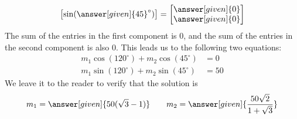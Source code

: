 \documentclass{ximera}
\begin{document}
\begin{example}
\begin{explanation}
\[\begin{bmatrix}
      \sin(\answer[given]{45}^\circ)
      \end{bmatrix}
      =
      \begin{bmatrix}
        \answer[given]{0}\\
        \answer[given]{0}
      \end{bmatrix}
    \]
    The sum of the entries in the first component is 0, and the sum of
    the entries in the second component is also 0. This leads us to
    the following two equations:
    \begin{align*}
      m_1\cos(120^\circ) + m_2\cos(45^\circ) &=0 \\
      m_1\sin(120^\circ) + m_2\sin(45^\circ) &=50
    \end{align*}
    We leave it to the reader to verify that the solution is
    \[
    m_1=\answer[given]{50(\sqrt{3}-1)} \qquad m_2=\answer[given]{\frac{50\sqrt{2}}{1+\sqrt{3}}}
    \]
  \end{explanation}
\end{example}


\end{document}
